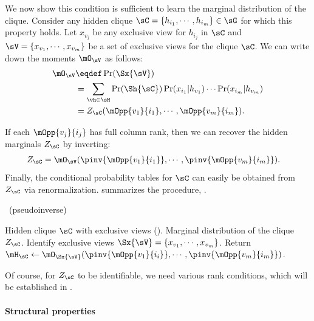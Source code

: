 We now show this condition is sufficient to learn the marginal
  distribution of the clique.
Consider any hidden clique $\sC = \{h_{i_1}, \cdots, h_{i_m}\} \in \sG$ for which this property holds. Let
  $x_{v_j}$ be any exclusive view for $h_{i_j}$ in $\sC$ and $\sV
  = \{x_{v_1}, \cdots, x_{v_m}\}$ be a set of exclusive views for the clique $\sC$.
We can write down the moments $\mO_\sV$ as follows:
\begin{align*}
  \mO_\sV 
  &\eqdef \Pr(\Sx{\sV}) \\
      &= \sum_{\vh \in \sH} \Pr(\Sh{\sC}) 
          \Pr(x_{i_1} | h_{v_1}) \cdots \Pr(x_{i_m} | h_{v_m}) \\
    &= Z_{\sC}(\mOpp{v_1}{i_1},\cdots,\mOpp{v_m}{i_m}).
\end{align*}

If each $\mOpp{v_j}{i_j}$ has full column rank, then we can recover the
hidden marginals $Z_\sC$ by inverting:
\begin{align*}
  Z_{\sC} &= \mO_\sV(\pinv{\mOpp{v_1}{i_1}},\cdots,\pinv{\mOpp{v_m}{i_m}}).
\end{align*}
Finally, the conditional probability tables for $\sC$ can easily be obtained from
  $Z_\sC$ via renormalization.
 summarizes the procedure, \LearnClique.

\begin{algorithm}
  \caption{\LearnClique~(pseudoinverse)}
  \label{algo:learnclique}
  \begin{algorithmic}
    \REQUIRE Hidden clique $\sC$ with exclusive views ().
    \ENSURE Marginal distribution of the clique $Z_\sC$.
      \STATE Identify exclusive views $\Sx{\sV} = \{x_{v_1}, \cdots, x_{v_m}\}$.
      \STATE Return $\mH_\sC \gets \mO_{\Sx{\sV}}( \pinv{\mOpp{v_1}{i_i}}, \cdots, \pinv{\mOpp{v_m}{i_m}} )$.
  \end{algorithmic}
\end{algorithm}
Of course, for $Z_{\sC}$ to be identifiable, we need various rank conditions,
which will be established in .

\paragraph{Structural properties}

